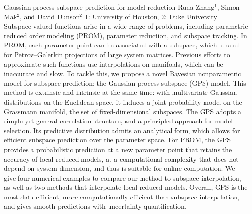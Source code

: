 \vspace{1.5ex}
\abs
{Gaussian process subspace prediction for model reduction}
{Ruda Zhang$^{1}$, Simon Mak$^{2}$, and David Dunson$^{2}$}
{1: University of Houston, 2: Duke University}
{Subspace-valued functions arise in a wide range of problems, including parametric reduced order modeling (PROM), parameter reduction, and subspace tracking. In PROM, each parameter point can be associated with a subspace, which is used for Petrov--Galerkin projections of large system matrices. Previous efforts to approximate such functions use interpolations on manifolds, which can be inaccurate and slow. To tackle this, we propose a novel Bayesian nonparametric model for subspace prediction: the Gaussian process subspace (GPS) model. This method is extrinsic and intrinsic at the same time: with multivariate Gaussian distributions on the Euclidean space, it induces a joint probability model on the Grassmann manifold, the set of fixed-dimensional subspaces. The GPS adopts a simple yet general correlation structure, and a principled approach for model selection. Its predictive distribution admits an analytical form, which allows for efficient subspace prediction over the parameter space. For PROM, the GPS provides a probabilistic prediction at a new parameter point that retains the accuracy of local reduced models, at a computational complexity that does not depend on system dimension, and thus is suitable for online computation. We give four numerical examples to compare our method to subspace interpolation, as well as two methods that interpolate local reduced models. Overall, GPS is the most data efficient, more computationally efficient than subspace interpolation, and gives smooth predictions with uncertainty quantification.}


